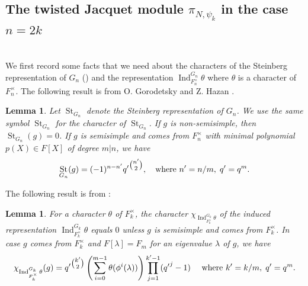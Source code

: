 \documentclass[reqno]{amsart}
\newtheorem{lemma}[theorem]{Lemma}
\theoremstyle{definition}
\theoremstyle{remark}
\numberwithin{equation}{section}
\DeclareMathOperator{\Ind}{Ind}
\DeclareMathOperator{\St}{St}
\begin{document}
\subsection{The twisted  Jacquet module $\pi_{N, \psi_k}$ in the case $n=2k$} \hfill \\
We first record some facts that we need about the characters of the Steinberg representation of $G_n$ (\cite{Carter_finite}) and the representation  
$\Ind_{F_n^\times}^{G_n} \theta$ where $\theta$ is a character of $F_n^\times$. The following result is from  
O. Gorodetsky and Z. Hazan \cite{HazGor}.
\begin{lemma} \cite[eq 6.2]{HazGor}\label{St_char}
    Let $\St_{G_n}$ denote the Steinberg representation of $G_n$. We use the same symbol $\St_{G_n}$ for the character of $\St_{G_n}$. If $g$ is non-semisimple, then $\St_{G_n}(g)=0$. If $g$ is semisimple and comes from $F_n^{\times}$ with minimal polynomial $p(X) \in F[X]$ of degree $m|n$, we have 
    \[\St_{G_n}(g)= (-1)^{n-n'} {q'}^{\tbinom{n'}{2}}, \quad \text{where 
 } n'=n/m, \; q' = q^m.\]
\end{lemma}
The following result is from \cite{Dip[1]}:
\begin{lemma} \cite[Lemma 1]{Dip[1]} \label{ind_char}
For a character $\theta$ of $F_k^\times$, the character $\chi_{\Ind_{F_k^\times}^{G_k} \theta}$ of the induced representation
$\Ind^{G_k}_{F_k^\times} \theta$ equals $0$ unless $g$ is semisimple and comes from $F_k^{\times}$. In case $g$ comes from $F_k^{\times}$ and $F[\lambda]=F_m$ for an eigenvalue $\lambda$ of $g$, we have
\[ \chi_{\Ind_{F_k^\times}^{G_k} \theta}(g) = {q'}^{\tbinom{k'}{2}}\left( \sum_{i=0}^{m-1} \theta(\phi^i(\lambda))\right)  \prod_{j=1}^{k'-1}({q'}^j-1)
\quad \text{ where } k'=k/m, \; q' = q^m.\]
 \end{lemma}
\end{document}
